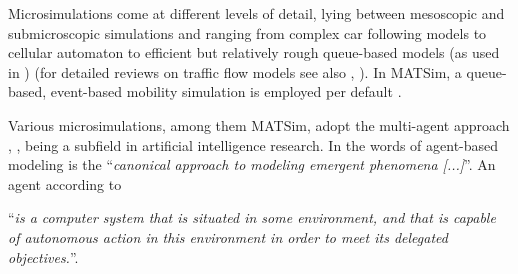 Microsimulations come at different levels of detail, lying between mesoscopic and submicroscopic simulations and ranging from complex car following models to cellular automaton to efficient but relatively rough queue-based models (as used in \citet[][]{Gawron_IJMPC_1998}) (for detailed reviews on traffic flow models see also \citet[][]{HoogendoornBovy_PImechE_2001}, \citet[][]{DarbhaEtAl_NA_2008}). In MATSim, a queue-based, event-based mobility simulation is employed per default \citep[][]{CharyparEtAl_TRR_2007}.

Various microsimulations, among them MATSim, adopt the multi-agent approach \citep[p.172ff][]{GilbertTroitzschKG_2005}, \citep[][]{Bonabeau_HBR_2002, SanfordBernhardt_TRBC_2007, Sun_2006}, being a subfield in artificial intelligence research. In the words of \citet[][p.7280]{Bonabeau_PNAS_2002} agent-based modeling is the ``\emph{canonical approach to modeling emergent phenomena [...]}''. An agent according to \citet[][p.21]{Wooldridge_2009} \begin{spacing}{1.0} ``\emph{is a computer system that is situated in some environment, and that is capable of autonomous action in this environment in order to meet its delegated objectives.}''. \end{spacing}

